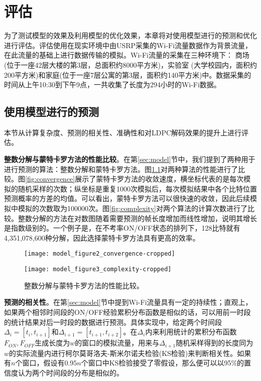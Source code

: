 
\chapter{评估}
\label{chap:evaluation}

为了测试模型的效果及利用模型的优化效果，本章将对使用模型进行的预测和优化进行评估。评估使用在现实环境中由USRP采集的Wi-Fi流量数据作为背景流量，在此流量的基础上进行数据传输的模拟。Wi-Fi流量的采集在三种环境下：
商场(位于一座42层大楼的第3层，总面积约8000平方米)，实验室
(大学校园内，面积约200平方米)和家庭(位于一座7层公寓的第3层，面积约140平方米)中。数据采集的时间从上午10:30到下午9点，一共收集了长度为294小时的Wi-Fi数据。

\section{使用模型进行的预测}
本节从计算复杂度、预测的相关性、准确性和对LDPC解码效果的提升上进行评估。

\textbf{整数分解与蒙特卡罗方法的性能比较}。在第\ref{sec:model}节中，我们提到了两种用于进行预测的算法：整数分解和蒙特卡罗方法。图\ref{fig:predict_comparison}对两种算法的性能进行了比较。图\ref{fig:convergence}展示了蒙特卡罗方法的收敛速度，横坐标代表的是每次模拟的随机采样的次数；纵坐标是重复1000次模拟后，每次模拟结果中各个比特位置预测概率的方差的均值。可以看出，蒙特卡罗方法可以很快速的收敛，因此后续模拟中模拟的次数取为100000次。图\ref{fig:complexity}对两个算法的计算次数进行了比较。整数分解的方法在对数图随着需要预测的帧长度增加而线性增加，说明其增长是指数级别的。一个例子是，在不考率ON/OFF状态的排列下，128比特就有4,351,078,600种分解，因此选择蒙特卡罗方法具有更高的效率。
\begin{figure}[b]
	\begin{minipage}[b]{.5\linewidth}
		\texttt{[image: model\_figure2\_convergence-cropped]}
		\label{fig:convergence}
	\end{minipage}
	\hfill
	\begin{minipage}[b]{.5\linewidth}
		\texttt{[image: model\_figure3\_complexity-cropped]}
		\label{fig:complexity}
	\end{minipage}
	\caption{整数分解与蒙特卡罗方法的性能比较。}\label{fig:predict_comparison}
\end{figure}

\textbf{预测的相关性}。在第\ref{sec:model}节中提到Wi-Fi流量具有一定的持续性；直观上，如果两个相邻时间段的ON/OFF经验累积分布函数是相似的话，可以用前一时段的统计结果对后一时段的数据进行预测。具体实现中，给定两个时间段$\Delta_i = [t_i, t_{i+1}]$和$\Delta_{i+1} = [t_{i+1}, t_{i+2}]$。在$\Delta_i$内来利用统计的累积分布函数$F_{ON},F_{OFF}$生成长度为$w$的窗口的模拟流量，用来与$\Delta_{i+1}$随机采样得到的长度同为$w$的实际流量内进行柯尔莫哥洛夫-斯米尔诺夫检验(KS检验)来判断相关性。如果有$n$个窗口，假设有$0.95n$个窗口中KS检验接受了零假设，那么便可以以95\%的置信度认为两个时间段的分布是相似的。

